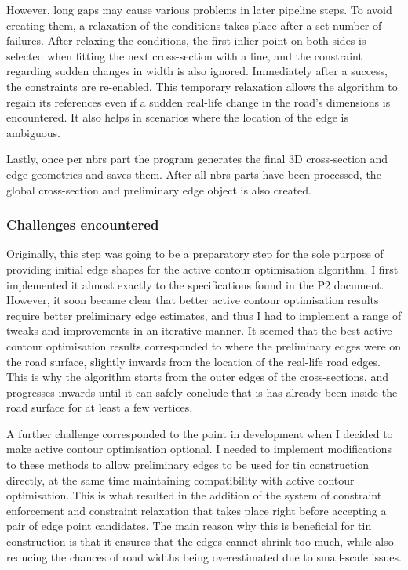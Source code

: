 However, long gaps may cause various problems in later pipeline steps. To avoid creating them, a relaxation of the conditions takes place after a set number of failures. After relaxing the conditions, the first inlier point on both sides is selected when fitting the next cross-section with a line, and the constraint regarding sudden changes in width is also ignored. Immediately after a success, the constraints are re-enabled. This temporary relaxation allows the algorithm to regain its references even if a sudden real-life change in the road's dimensions is encountered. It also helps in scenarios where the location of the edge is ambiguous.

Lastly, once per \ac{nbrs} part the program generates the final 3D cross-section and edge geometries and saves them. After all \ac{nbrs} parts have been processed, the global cross-section and preliminary edge object is also created.

\subsubsection{Challenges encountered}

Originally, this step was going to be a preparatory step for the sole purpose of providing initial edge shapes for the active contour optimisation algorithm. I first implemented it almost exactly to the specifications found in the P2 document. However, it soon became clear that better active contour optimisation results require better preliminary edge estimates, and thus I had to implement a range of tweaks and improvements in an iterative manner. It seemed that the best active contour optimisation results corresponded to where the preliminary edges were on the road surface, slightly inwards from the location of the real-life road edges. This is why the algorithm starts from the outer edges of the cross-sections, and progresses inwards until it can safely conclude that is has already been inside the road surface for at least a few vertices.

A further challenge corresponded to the point in development when I decided to make active contour optimisation optional. I needed to implement modifications to these methods to allow preliminary edges to be used for \ac{tin} construction directly, at the same time maintaining compatibility with active contour optimisation. This is what resulted in the addition of the system of constraint enforcement and constraint relaxation that takes place right before accepting a pair of edge point candidates. The main reason why this is beneficial for \ac{tin} construction is that it ensures that the edges cannot shrink too much, while also reducing the chances of road widths being overestimated due to small-scale issues.

